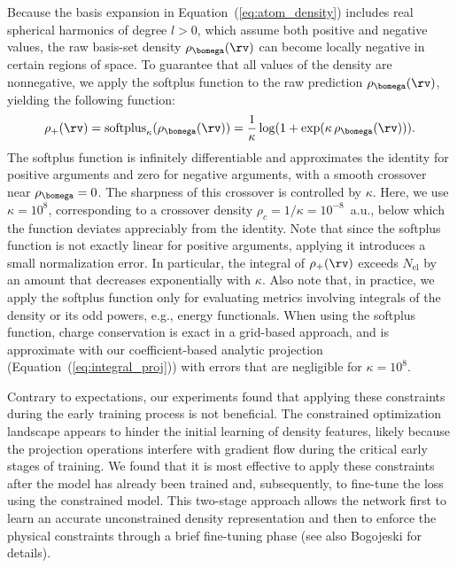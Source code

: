 \documentclass[12pt]{article}
\begin{document}
Because the basis expansion in Equation~(\ref{eq:atom_density}) includes real spherical harmonics of degree $l>0$, which assume both positive and negative values, the raw basis-set density $\rho_{\bomega}(\rv)$ can become locally negative in certain regions of space.
To guarantee that all values of the density are nonnegative, we apply the softplus function to the raw prediction $\rho_{\bomega}(\rv)$, yielding the following function:
\begin{equation}
  \rho_+(\rv) = \mathrm{softplus}_\kappa(\rho_{\bomega}(\rv)) = \frac{1}{\kappa}\log(1+\exp(\kappa\,\rho_{\bomega}(\rv))).
\end{equation}
The softplus function is infinitely differentiable and approximates the identity for positive arguments and zero for negative arguments, with a smooth crossover near $\rho_{\bomega} = 0$. The sharpness of this crossover is controlled by $\kappa$. 
Here, we use $\kappa = 10^8$, corresponding to a crossover density $\rho_c = 1/\kappa = 10^{-8}$~a.u., below which the function deviates appreciably from the identity. 
Note that since the softplus function is not exactly linear for positive arguments, applying it introduces a small normalization error. 
In particular, the integral of $\rho_+(\rv)$ exceeds $N_\mathrm{el}$ by an amount that decreases exponentially with $\kappa$. 
Also note that, in practice, we apply the softplus function only for evaluating metrics involving integrals of the density or its odd powers, e.g., energy functionals. 
When using the softplus function, charge conservation is exact in a grid-based approach, and is approximate with our coefficient-based analytic projection (Equation~(\ref{eq:integral_proj})) with errors that are negligible for $\kappa=10^8$.


Contrary to expectations, our experiments found that applying these constraints during the early training process is not beneficial. The constrained optimization landscape appears to hinder the initial learning of density features, likely because the projection operations interfere with gradient flow during the critical early stages of training. We found that it is most effective to apply these constraints after the model has already been trained and, subsequently, to fine-tune the loss using the constrained model. This two-stage approach allows the network first to learn an accurate unconstrained density representation and then to enforce the physical constraints through a brief fine-tuning phase (see also Bogojeski\cite{bogojeski2023machine} for details).
\end{document}
